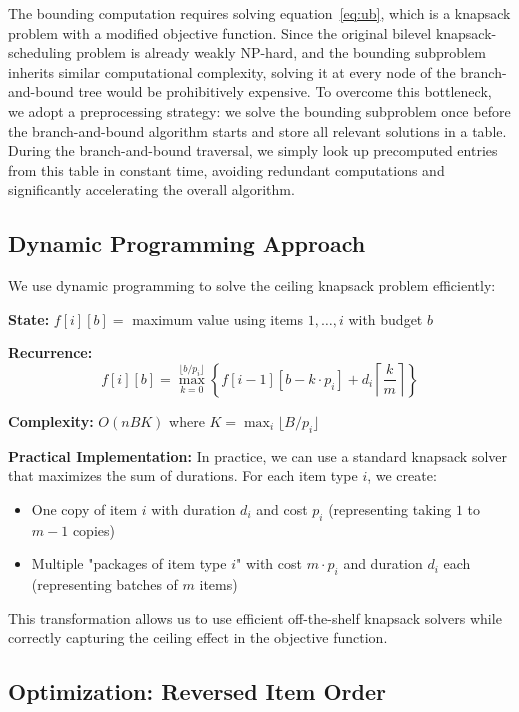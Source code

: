 The bounding computation requires solving equation~\eqref{eq:ub}, which is a knapsack problem with a modified objective function. Since the original bilevel knapsack-scheduling problem is already weakly NP-hard, and the bounding subproblem inherits similar computational complexity, solving it at every node of the branch-and-bound tree would be prohibitively expensive. To overcome this bottleneck, we adopt a preprocessing strategy: we solve the bounding subproblem once before the branch-and-bound algorithm starts and store all relevant solutions in a table. During the branch-and-bound traversal, we simply look up precomputed entries from this table in constant time, avoiding redundant computations and significantly accelerating the overall algorithm.

\subsection{Dynamic Programming Approach}

We use dynamic programming to solve the ceiling knapsack problem efficiently:

\textbf{State:} $f[i][b] =$ maximum value using items $1, \ldots, i$ with budget $b$

\textbf{Recurrence:}
\begin{equation}
f[i][b] = \max_{k=0}^{\lfloor b/p_i \rfloor} \left\{ f[i-1][b - k \cdot p_i] + d_i \left\lceil \frac{k}{m} \right\rceil \right\}
\end{equation}

\textbf{Complexity:} $O(nBK)$ where $K = \max_i \lfloor B/p_i \rfloor$

\textbf{Practical Implementation:} In practice, we can use a standard knapsack solver that maximizes the sum of durations. For each item type $i$, we create:
\begin{itemize}
    \item One copy of item $i$ with duration $d_i$ and cost $p_i$ (representing taking $1$ to $m-1$ copies)
    \item Multiple "packages of item type $i$" with cost $m \cdot p_i$ and duration $d_i$ each (representing batches of $m$ items)
\end{itemize}
This transformation allows us to use efficient off-the-shelf knapsack solvers while correctly capturing the ceiling effect in the objective function.

\subsection{Optimization: Reversed Item Order}

